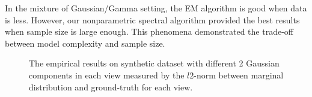 \documentclass[11pt]{article}
\begin{document}
In the mixture of Gaussian/Gamma setting, the EM algorithm is good when data is less. However, our nonparametric spectral algorithm provided the best results when sample size is large enough. This phenomena demonstrated the trade-off between model complexity and sample size. 




\begin{figure}
\caption{The empirical results on synthetic dataset with different 2 Gaussian components in each view measured by the $l2$-norm between marginal distribution and ground-truth for each view.}
\end{figure}
\end{document}
